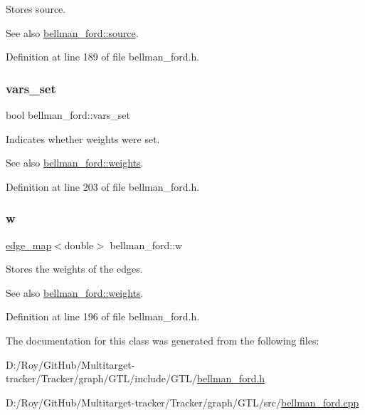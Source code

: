 Stores source. 

\begin{DoxySeeAlso}{See also}
\mbox{\hyperlink{classbellman__ford_a98cad540fd2d211c1ba44bb6fa8416f3}{bellman\+\_\+ford\+::source}}. 
\end{DoxySeeAlso}


Definition at line 189 of file bellman\+\_\+ford.\+h.

\mbox{\label{classbellman__ford_a0b727de83366d019041694f890f19dbb}} 
\subsubsection{\texorpdfstring{vars\+\_\+set}{vars\_set}}
{\footnotesize\ttfamily bool bellman\+\_\+ford\+::vars\+\_\+set\hspace{0.3cm}{\ttfamily [private]}}



Indicates whether weights were set. 

\begin{DoxySeeAlso}{See also}
\mbox{\hyperlink{classbellman__ford_a9e276cc9f30c2e608d320db4a08b2a74}{bellman\+\_\+ford\+::weights}}. 
\end{DoxySeeAlso}


Definition at line 203 of file bellman\+\_\+ford.\+h.

\mbox{\label{classbellman__ford_ae05c9a40c2257f1e1f333b6a4f6fa656}} 
\subsubsection{\texorpdfstring{w}{w}}
{\footnotesize\ttfamily \mbox{\hyperlink{classedge__map}{edge\+\_\+map}}$<$double$>$ bellman\+\_\+ford\+::w\hspace{0.3cm}{\ttfamily [private]}}



Stores the weights of the edges. 

\begin{DoxySeeAlso}{See also}
\mbox{\hyperlink{classbellman__ford_a9e276cc9f30c2e608d320db4a08b2a74}{bellman\+\_\+ford\+::weights}}. 
\end{DoxySeeAlso}


Definition at line 196 of file bellman\+\_\+ford.\+h.



The documentation for this class was generated from the following files\+:\begin{DoxyCompactItemize}
\item 
D\+:/\+Roy/\+Git\+Hub/\+Multitarget-\/tracker/\+Tracker/graph/\+G\+T\+L/include/\+G\+T\+L/\mbox{\hyperlink{bellman__ford_8h}{bellman\+\_\+ford.\+h}}\item 
D\+:/\+Roy/\+Git\+Hub/\+Multitarget-\/tracker/\+Tracker/graph/\+G\+T\+L/src/\mbox{\hyperlink{bellman__ford_8cpp}{bellman\+\_\+ford.\+cpp}}\end{DoxyCompactItemize}
